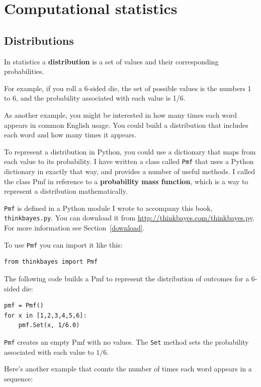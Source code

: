 \documentclass[12pt]{book}
\begin{document}
\chapter{Computational statistics}
\label{compstat}

\section{Distributions}

In statistics a {\bf distribution} is a set of values and their
corresponding probabilities.

For example, if you roll a 6-sided die, the set of possible
values is the numbers 1 to 6, and the probability associated
with each value is 1/6.

As another example, you might be interested in how many times each
word appears in common English usage.  You could build a distribution
that includes each word and how many times it appears.

To represent a distribution in Python, you could use a dictionary that
maps from each value to its probability.  I have written a class
called {\tt Pmf} that uses a Python dictionary in exactly that way,
and provides a number of useful methods.
I called the class Pmf in reference to 
a {\bf probability mass function}, which is a way to
represent a distribution mathematically.

{\tt Pmf} is defined in a Python module I wrote to accompany this
book, {\tt thinkbayes.py}.  You can download it from
\url{http://thinkbayes.com/thinkbayes.py}.    For more information
see Section~\ref{download}.

To use {\tt Pmf} you can import it like this:

\begin{verbatim}
from thinkbayes import Pmf
\end{verbatim}

The following code builds a Pmf to represent the distribution
of outcomes for a 6-sided die:

\begin{verbatim}
pmf = Pmf()
for x in [1,2,3,4,5,6]:
    pmf.Set(x, 1/6.0)
\end{verbatim}

\verb"Pmf" creates an empty Pmf with no values.  The
\verb"Set" method sets the probability associated with each
value to $1/6$.

Here's another example that counts the number of times each word
appears in a sequence:
\end{document}
